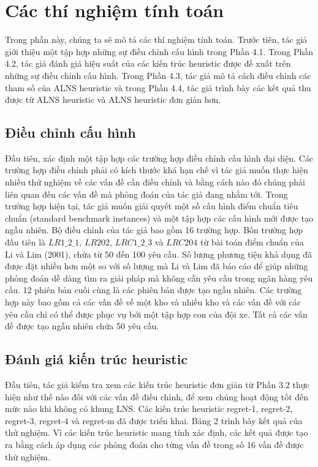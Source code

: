 \chapter{Các thí nghiệm tính toán}
Trong phần này, chúng ta sẽ mô tả các thí nghiệm tính toán. Trước tiên, tác giả giới thiệu một tập hợp những sự điều chỉnh cấu hình trong Phần 4.1. Trong Phần 4.2, tác giả đánh giá hiệu suất của các kiến trúc heuristic được đề xuất trên những sự điều chỉnh cấu hình. Trong Phần 4.3, tác giả mô tả cách điều chỉnh các tham số của ALNS heuristic và trong Phần 4.4, tác giả trình bày các kết quả thu được từ ALNS heuristic và ALNS heuristic đơn giản hơn.

\section{Điều chỉnh cấu hình}
Đầu tiên, xác định một tập hợp các trường hợp điều chỉnh cấu hình đại diện. Các trường hợp điều chỉnh phải có kích thước khá hạn chế vì tác giả muốn thực hiện nhiều thử nghiệm về các vấn đề cần điều chỉnh và bằng cách nào đó chúng phải liên quan đến các vấn đề mà phỏng đoán của tác giả đang nhắm tới. Trong trường hợp hiện tại, tác giả muốn giải quyết một số cấu hình điểm chuẩn tiêu chuẩn (standard benchmark instances) và một tập hợp các cấu hình mới được tạo ngẫu nhiên.
Bộ điều chỉnh của tác giả bao gồm 16 trường hợp. Bốn trường hợp đầu tiên là $LR1\_2\_1$, $LR202$, $LRC1\_2\_3$ và $LRC204$ từ bài toán điểm chuẩn của Li và Lim (2001), chứa từ 50 đến 100 yêu cầu. Số lượng phương tiện khả dụng đã được đặt nhiều hơn một so với số lượng mà Li và Lim đã báo cáo để giúp những phỏng đoán dễ dàng tìm ra giải pháp mà không cần yêu cầu trong ngân hàng yêu cầu. 12 phiên bản cuối cùng là các phiên bản được tạo ngẫu nhiên. Các trường hợp này bao gồm cả các vấn đề về một kho và nhiều kho và các vấn đề với các yêu cầu chỉ có thể được phục vụ bởi một tập hợp con của đội xe. Tất cả các vấn đề được tạo ngẫu nhiên chứa 50 yêu cầu.

\section{Đánh giá kiến trúc heuristic}
Đầu tiên, tác giả kiểm tra xem các kiến trúc heuristic đơn giản từ Phần 3.2 thực hiện như thế nào đối với các vấn đề điều chỉnh, để xem chúng hoạt động tốt đến mức nào khi không có khung LNS. Các kiến trúc heuristic regret-1, regret-2, regret-3, regret-4 và regret-m đã được triển khai. Bảng 2 trình bày kết quả của thử nghiệm. Vì các kiến trúc heuristic mang tính xác định, các kết quả được tạo ra bằng cách áp dụng các phỏng đoán cho từng vấn đề trong số 16 vấn đề được thử nghiệm.

